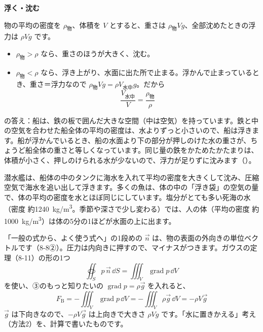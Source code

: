 \noindent\textbf{浮く・沈む}\par\nobreak
物の平均の密度を $\rho_{\text{物}}$、体積を $V$ とすると、重さは $\rho_{\text{物}}Vg$、全部沈めたときの浮力は $\rho Vg$ です。
\begin{itemize}[leftmargin=1.2\zw, itemsep=2pt, topsep=2pt, label={\color{bkTheme}●}]
\item $\rho_{\text{物}}>\rho$ なら、重さのほうが大きく、沈む。
\item $\rho_{\text{物}}<\rho$ なら、浮き上がり、水面に出た所で止まる。浮かんで止まっているとき、重さ＝浮力なので $\rho_{\text{物}}Vg=\rho V_{\text{水中}}g$。だから
\[ \frac{V_{\text{水中}}}{V}=\frac{\rho_{\text{物}}}{\rho} \]
\end{itemize}
\label{ph:力-12:fune}\bkhatenaref の答え：船は、鉄の板で囲んだ大きな空間（中は空気）を持っています。鉄と中の空気を合わせた船全体の平均の密度は、水よりずっと小さいので、船は浮きます。船が浮かんでいるとき、船の水面より下の部分が押しのけた水の重さが、ちょうど船全体の重さと等しくなっています。同じ量の鉄をかためたかたまりは、体積が小さく、押しのけられる水が少ないので、浮力が足りずに沈みます（\nobreak{}\nobreak）。
\begin{phmijika}[浮いたり沈んだり]
潜水艦は、船体の中のタンクに海水を入れて平均の密度を大きくして沈み、圧縮空気で海水を追い出して浮きます。多くの魚は、体の中の「浮き袋」の空気の量で、体の平均の密度を水とほぼ同じにしています。塩分がとても多い死海の水（密度 約\qty{1240}{kg/m^3}。季節や深さで少し変わる）では、人の体（平均の密度 約\qty{1000}{kg/m^3}）は体の5分の1ほどが水面の上に出ます。
\end{phmijika}
\begin{phflow}
\end{phflow}
\begin{motto}[5]
「一般の式から、よく使う式へ」の1段めの $\vec{n}$ は、物の表面の外向きの単位ベクトルです（8-8②）。圧力は内向きに押すので、マイナスがつきます。ガウスの定理（8-11）の形の1つ
\[ \oiint_S p\,\vec{n}\,\dd S=\iiint_V\operatorname{grad}p\,\dd V \]
を使い、③のもっと知りたいの $\operatorname{grad}p=\rho\vec{g}$ を入れると、
\[ F_{\mathrm{B}}=-\iiint_V\operatorname{grad}p\,\dd V=-\iiint_V\rho\vec{g}\,\dd V=-\rho V\vec{g} \]
$\vec{g}$ は下向きなので、$-\rho V\vec{g}$ は上向きで大きさ $\rho Vg$ です。「水に置きかえる」考え（方法2）を、計算で書いたものです。
\end{motto}

